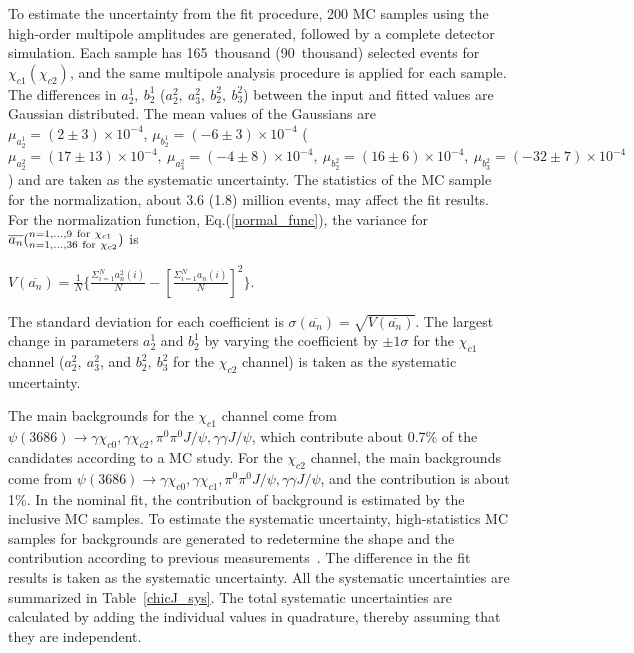 \documentclass[prd,twocolumn,showpacs,amsmath,amssymb]{revtex4-1}
\begin{document}
To estimate the uncertainty from the fit procedure, 200 MC samples using the high-order multipole amplitudes are generated, followed by a complete detector simulation. Each sample has 165~thousand (90~thousand) selected events for $\chi_{c1}(\chi_{c2})$, and the same multipole analysis procedure is applied for each sample.
The differences in $a_2^{1}, ~b_2^{1}$ ($a_2^{2},~a_3^{2}, ~b_2^{2},~b_3^{2}$) between the input and fitted values are Gaussian distributed.
The mean values of the Gaussians are $\mu_{a_2^{1}}=(2\pm3)\times 10^{-4}$, $\mu_{b_2^{1}}=(-6\pm3)\times 10^{-4}$ ($\mu_{a_2^{2}}=(17\pm13)\times 10^{-4},~\mu_{a_3^{2}}=(-4\pm8)\times 10^{-4}, ~\mu_{b_2^{2}}=(16\pm6)\times10^{-4},~\mu_{b_3^{2}}=(-32\pm7)\times10^{-4}$) and are taken as the systematic uncertainty.
The statistics of the MC sample for the normalization, about 3.6 (1.8) million events, may affect the fit results. For the normalization function, Eq.(\ref{normal_func}),
the variance for $\overline{a_{n}}(^{n=1,\ldots,9~{\rm for}~\chi_{c1}}_{n=1,\ldots,36~{\rm for}~\chi_{c2}})$ is
%
\begin{center}\label{square_de_a1}
  $V(\overline{a_{n}}) = \frac{1}{N}\{\frac{\Sigma^{N}_{i=1}a_{n}^{2}(i)}{N}-[\frac{\Sigma^{N}_{i=1}a_{n}(i)}{N}]^{2}\}.$
\end{center}
%
\noindent The standard deviation for each coefficient is $\sigma(\overline{a_{n}}) = \sqrt{V(\overline{a_{n}})}$. The largest change in parameters
$a_2^{1}$ and $b_2^{1}$ by varying the coefficient by $\pm1\sigma$ for the $\chi_{c1}$ channel ($a_2^{2},~a_3^{2}$, and
$b_2^{2},~b_3^{2}$ for the $\chi_{c2}$ channel) is taken as the systematic uncertainty.

The main backgrounds for the $\chi_{c1}$ channel come from $\psi(3686)\rightarrow\gamma\chi_{c0},\gamma\chi_{c2},\pi^{0}\pi^{0}J/\psi,\gamma\gamma J/\psi$,
which contribute about 0.7\% of the candidates according to a MC study. For the $\chi_{c2}$ channel, the main backgrounds come
from $\psi(3686)\rightarrow\gamma\chi_{c0},\gamma\chi_{c1},\pi^{0}\pi^{0}J/\psi,\gamma\gamma J/\psi$, and
the contribution is about 1\%. In the nominal fit, the contribution of background is estimated by the inclusive MC samples.
To estimate the systematic uncertainty, high-statistics MC samples for backgrounds are generated to redetermine the shape and the contribution according to
previous measurements~\cite{pi0j,PDG,BESIII_chicj}. The difference in the fit results is taken as the systematic uncertainty.
All the systematic uncertainties are summarized in Table~\ref{chicJ_sys}. The total systematic uncertainties are calculated by adding the individual values in
quadrature, thereby assuming that they are independent.
\end{document}
